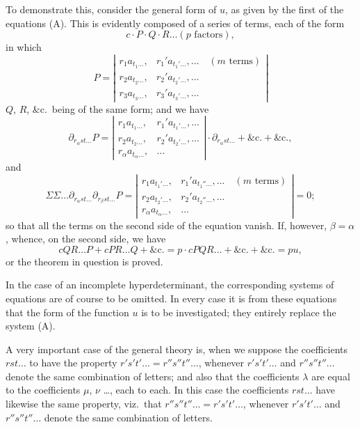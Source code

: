 \documentclass[11pt,a4paper]{article}
\theoremstyle{plain}
\theoremstyle{definition}
\theoremstyle{remark}
\begin{document}
To demonstrate this, consider the general form of $u$, as given by the first of the
equations (A). This is evidently composed of a series of terms, each of the form
\[
c \cdot P \cdot Q \cdot R \ldots (p \text{ factors}),
\]
in which
\[
P = \left|\begin{array}{cc}
r_1 a_{t_1 \ldots}, & r_1' a_{t_1' \ldots}, \ldots \quad (m \text{ terms}) \\
r_2 a_{t_2 \ldots}, & r_2' a_{t_2' \ldots}, \ldots \\
r_3 a_{t_3 \ldots}, & r_3' a_{t_3' \ldots}, \ldots
\end{array}\right|
\]
$Q$, $R$, \&c.\ being of the same form; and we have
\[
\partial_{r_\alpha st\ldots} P = \left|\begin{array}{cc}
r_1 a_{t_1 \ldots}, & r_1' a_{t_1' \ldots}, \ldots \\
r_2 a_{t_2 \ldots}, & r_2' a_{t_2' \ldots}, \ldots \\
r_\alpha a_{t_\alpha \ldots}, & \ldots
\end{array}\right| \cdot \partial_{r_\alpha st\ldots} + \&\text{c.} + \&\text{c.},
\]
and
\[
\Sigma \Sigma \ldots \partial_{r_\alpha st\ldots} \partial_{r_\beta st\ldots} P =
\left|\begin{array}{cc}
r_1 a_{t_1' \ldots}, & r_1' a_{t_1'' \ldots}, \ldots \quad (m \text{ terms}) \\
r_2 a_{t_2' \ldots}, & r_2' a_{t_2'' \ldots}, \ldots \\
r_\alpha a_{t_\alpha \ldots}, & \ldots
\end{array}\right| = 0;
\]
so that all the terms on the second side of the equation vanish. If, however, $\beta = \alpha$,
whence, on the second side, we have
\[
cQR\ldots P + cPR\ldots Q + \&\text{c.} = p \cdot cPQR\ldots + \&\text{c.} + \&\text{c.}
= pu,
\]
or the theorem in question is proved.

In the case of an incomplete hyperdeterminant, the corresponding systems of
equations are of course to be omitted. In every case it is from these equations that
the form of the function $u$ is to be investigated; they entirely replace the system (A).

A very important case of the general theory is, when we suppose the coefficients
$rst\ldots$ to have the property $r's't'\ldots = r''s''t''\ldots$, whenever $r's't'\ldots$ and $r''s''t''\ldots$ denote
the same combination of letters; and also that the coefficients $\lambda$ are equal to the
coefficients $\mu$, $\nu$ \ldots, each to each. In this case the coefficients $rst\ldots$ have likewise
the same property, viz.\ that $r''s''t''\ldots = r's't'\ldots$, whenever $r's't'\ldots$ and $r''s''t''\ldots$ denote
the same combination of letters.
\end{document}
